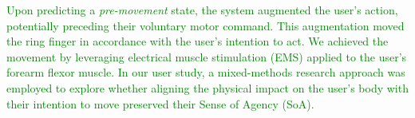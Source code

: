 \textcolor{green}{Upon predicting a \textit{pre-movement} state, the system augmented the user's action, potentially preceding their voluntary motor command. This augmentation moved the ring finger in accordance with the user's intention to act. We achieved the movement by leveraging electrical muscle stimulation (EMS) applied to the user's forearm flexor muscle. In our user study, a mixed-methods research approach was employed to explore whether aligning the physical impact on the user's body with their intention to move preserved their Sense of Agency (SoA).}

